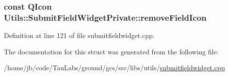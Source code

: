 \hypertarget{struct_utils_1_1_submit_field_widget_private_ad187fd205eb615850c5c785caa617d89}{
\subsubsection[{remove\-Field\-Icon}]{\setlength{\rightskip}{0pt plus 5cm}const \-Q\-Icon {\bf \-Utils\-::\-Submit\-Field\-Widget\-Private\-::remove\-Field\-Icon}}}\label{struct_utils_1_1_submit_field_widget_private_ad187fd205eb615850c5c785caa617d89}


\-Definition at line 121 of file submitfieldwidget.\-cpp.



\-The documentation for this struct was generated from the following file\-:\begin{DoxyCompactItemize}
\item 
/home/jb/code/\-Tau\-Labs/ground/gcs/src/libs/utils/\hyperlink{submitfieldwidget_8cpp}{submitfieldwidget.\-cpp}\end{DoxyCompactItemize}
